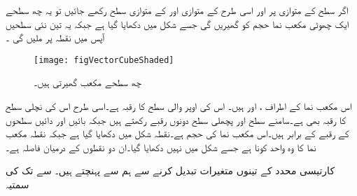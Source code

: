 اگر سطح   کے متوازی  پر اور اسی طرح  کے متوازی  اور  کے متوازی  سطح رکھے جائیں تو یہ چھ سطحے ایک چھوٹی  مکعب نما حجم  کو گھیریں گی جسے شکل  میں دکھایا گیا ہے جبکہ یہ تین نئی سطحیں آپس میں نقطہ  پر ملیں گی ۔
\begin{figure}
\centering
\texttt{[image: figVectorCubeShaded]}
\caption{چھ سطحے مکعب گھیرتی ہیں۔}
\label{شکل_سمتیہ_کارتیسی_چھوٹی_مکعب}
\end{figure}
اس مکعب نما کے اطراف ،  اور  ہیں۔ اس کی اوپر والی سطح کا رقبہ  ہے۔اسی طرح اس کی نچلی سطح کا رقبہ بھی  ہے۔سامنے سطح  اور پچھلی سطح دونوں  رقبے رکھتے ہیں جبکہ بائیں  اور دائیں سطحوں کے رقبے  کے برابر ہیں۔اس مکعب نما کی حجم  ہے۔نقطہ  شکل میں دکھایا گیا ہے جبکہ
 نقطہ  مکعب نما کا وہ واحد کونا ہے جسے شکل میں نہیں دکھایا گیا۔ان دو نقطوں کے درمیان فاصلہ  ہے۔ 

کارتیسی محدد کے تینوں متغیرات تبدیل کرنے سے ہم  سے  پہنچتے ہیں۔ سے  تک کی سمتیہ

